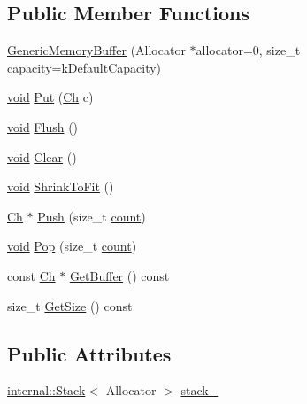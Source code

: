 \subsection*{Public Member Functions}
\begin{DoxyCompactItemize}
\item 
\hyperlink{structGenericMemoryBuffer_ad08f7da47bca43fcdb0c3b10e22dfa1d}{Generic\+Memory\+Buffer} (Allocator $\ast$allocator=0, size\+\_\+t capacity=\hyperlink{structGenericMemoryBuffer_af6ecdbdbb8d3aa53cdef6e788e4980be}{k\+Default\+Capacity})
\item 
\hyperlink{imgui__impl__opengl3__loader_8h_ac668e7cffd9e2e9cfee428b9b2f34fa7}{void} \hyperlink{structGenericMemoryBuffer_a9dfb477983e211893601f8ab637b42d8}{Put} (\hyperlink{structGenericMemoryBuffer_a212f137abfd8bce2ad216b2d960c027f}{Ch} c)
\item 
\hyperlink{imgui__impl__opengl3__loader_8h_ac668e7cffd9e2e9cfee428b9b2f34fa7}{void} \hyperlink{structGenericMemoryBuffer_a9861181cab6f5bec2ec08b601aa53575}{Flush} ()
\item 
\hyperlink{imgui__impl__opengl3__loader_8h_ac668e7cffd9e2e9cfee428b9b2f34fa7}{void} \hyperlink{structGenericMemoryBuffer_a036cbe2556778e1edc525602a9821df2}{Clear} ()
\item 
\hyperlink{imgui__impl__opengl3__loader_8h_ac668e7cffd9e2e9cfee428b9b2f34fa7}{void} \hyperlink{structGenericMemoryBuffer_a3b87deb9bf34c394c8fb262ab53c0c4b}{Shrink\+To\+Fit} ()
\item 
\hyperlink{structGenericMemoryBuffer_a212f137abfd8bce2ad216b2d960c027f}{Ch} $\ast$ \hyperlink{structGenericMemoryBuffer_a56f7b14d2940b682fe592f598d6792ec}{Push} (size\+\_\+t \hyperlink{imgui__impl__opengl3__loader_8h_a619bc20e8198de3bd3f3d7fc34de66b2}{count})
\item 
\hyperlink{imgui__impl__opengl3__loader_8h_ac668e7cffd9e2e9cfee428b9b2f34fa7}{void} \hyperlink{structGenericMemoryBuffer_a82a6706286f1356e1769282f5d496005}{Pop} (size\+\_\+t \hyperlink{imgui__impl__opengl3__loader_8h_a619bc20e8198de3bd3f3d7fc34de66b2}{count})
\item 
const \hyperlink{structGenericMemoryBuffer_a212f137abfd8bce2ad216b2d960c027f}{Ch} $\ast$ \hyperlink{structGenericMemoryBuffer_a8d7be8b1d64285b787571541a7c4bb37}{Get\+Buffer} () const
\item 
size\+\_\+t \hyperlink{structGenericMemoryBuffer_aaab1f18d03109ab01213d3e3d8368ff9}{Get\+Size} () const
\end{DoxyCompactItemize}
\subsection*{Public Attributes}
\begin{DoxyCompactItemize}
\item 
\hyperlink{classinternal_1_1Stack}{internal\+::\+Stack}$<$ Allocator $>$ \hyperlink{structGenericMemoryBuffer_a977b479180bebe8ae14ca1c11d52a486}{stack\+\_\+}
\end{DoxyCompactItemize}
